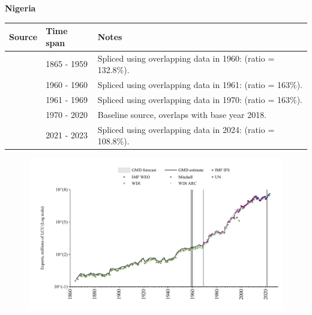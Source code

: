 \documentclass[12pt,a4paper,landscape]{article}
\begin{document}
\begin{adjustbox}{max totalsize={\paperwidth}{\paperheight},center}
\begin{minipage}[t][\textheight][t]{\textwidth}
\vspace*{0.5cm}
{}
\begin{center}
{\Large\bfseries Nigeria}
\end{center}
\vspace{0.5cm}
\begin{table}[H]
\centering
\small
\begin{tabular}{|l|l|l|}
\hline
\textbf{Source} & \textbf{Time span} & \textbf{Notes} \\
\hline
\rowcolor{white}\cite{Mitchell}& 1865 - 1959 &Spliced using overlapping data in 1960: (ratio = 132.8\%).\\
\rowcolor{lightgray}\cite{WDI}& 1960 - 1960 &Spliced using overlapping data in 1961: (ratio = 163\%).\\
\rowcolor{white}\cite{WDI_ARC}& 1961 - 1969 &Spliced using overlapping data in 1970: (ratio = 163\%).\\
\rowcolor{lightgray}\cite{UN}& 1970 - 2020 &Baseline source, overlaps with base year 2018.\\
\rowcolor{white}\cite{IMF_IFS}& 2021 - 2023 &Spliced using overlapping data in 2024: (ratio = 108.8\%).\\
\hline
\end{tabular}
\end{table}
\begin{figure}[H]
\centering
\includegraphics[width=\textwidth,height=0.6\textheight,keepaspectratio]{graphs/NGA_exports.pdf}
\end{figure}
\end{minipage}
\end{adjustbox}
\end{document}
